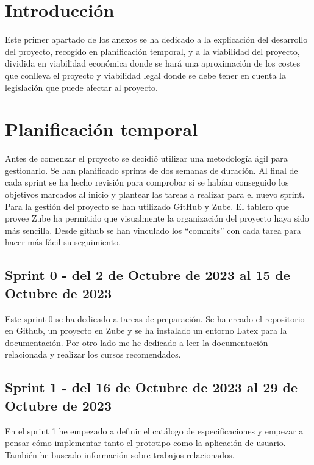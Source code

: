 
\section{Introducción}
Este primer apartado de los anexos se ha dedicado a la explicación del
desarrollo del proyecto, recogido en planificación temporal, y a la viabilidad
del proyecto, dividida en viabilidad económica donde se hará una aproximación de los costes que conlleva el proyecto y viabilidad legal donde se debe
tener en cuenta la legislación que puede afectar al proyecto.

\section{Planificación temporal}
Antes de comenzar el proyecto se decidió utilizar una metodología ágil para
gestionarlo. Se han planificado sprints de dos semanas de duración.
Al final de cada sprint se ha hecho revisión para comprobar si se habían
conseguido los objetivos marcados al inicio y plantear las tareas a
realizar para el nuevo sprint.
Para la gestión del proyecto se han utilizado GitHub y Zube. El
tablero que provee Zube ha permitido que visualmente la organización
del proyecto haya sido más sencilla. Desde github se han vinculado los ``commits'' 
con cada tarea para hacer más fácil su seguimiento.

\subsection{Sprint 0 - del 2 de Octubre de 2023 al 15 de Octubre de 2023}
Este sprint 0 se ha dedicado a tareas de preparación.
Se ha creado el repositorio en Github, un proyecto en Zube y se ha instalado 
un entorno Latex para la documentación.
Por otro lado me he dedicado a leer la documentación relacionada y 
realizar los cursos recomendados.
\subsection{Sprint 1 - del 16 de Octubre de 2023 al 29 de Octubre de 2023}
En el sprint 1 he empezado a definir el catálogo de especificaciones y empezar a 
pensar cómo implementar tanto el prototipo como la aplicación de usuario.
También he buscado información sobre trabajos relacionados.
